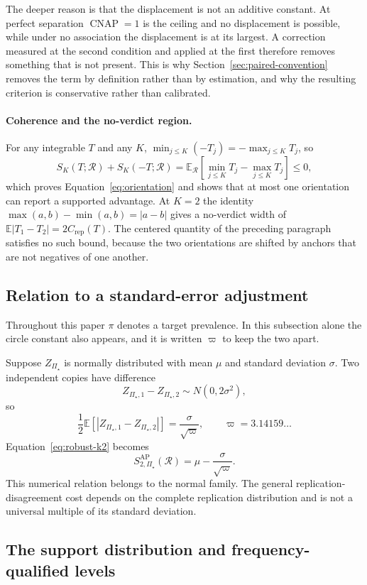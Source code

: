 \documentclass[11pt]{article}
\newcommand{\CNAP}{\operatorname{CNAP}}
\newcommand{\Regime}{\mathcal{R}}
\newcommand{\PSet}{\Pi_\star}
\newcommand{\E}{\mathbb{E}}
\theoremstyle{remark}
\begin{document}
The deeper reason is that the displacement is not an additive constant. At perfect separation $\CNAP=1$ is the ceiling and no displacement is possible, while under no association the displacement is at its largest. A correction measured at the second condition and applied at the first therefore removes something that is not present. This is why Section~\ref{sec:paired-convention} removes the term by definition rather than by estimation, and why the resulting criterion is conservative rather than calibrated.

\paragraph{Coherence and the no-verdict region.}
For any integrable $T$ and any $K$, $\min_{j\leq K}(-T_j)=-\max_{j\leq K}T_j$, so
\[
S_K(T;\Regime)+S_K(-T;\Regime)
=
\E_{\Regime}
\left[
\min_{j\leq K}T_j-\max_{j\leq K}T_j
\right]
\leq0,
\]
which proves Equation~\eqref{eq:orientation} and shows that at most one orientation can report a supported advantage. At $K=2$ the identity $\max(a,b)-\min(a,b)=|a-b|$ gives a no-verdict width of $\E|T_1-T_2|=2C_{\mathrm{rep}}(T)$. The centered quantity of the preceding paragraph satisfies no such bound, because the two orientations are shifted by anchors that are not negatives of one another.

\subsection{Relation to a standard-error adjustment}

Throughout this paper $\pi$ denotes a target prevalence. In this subsection alone the circle constant also appears, and it is written $\varpi$ to keep the two apart.

Suppose $Z_{\PSet}$ is normally distributed with mean $\mu$ and standard deviation $\sigma$. Two independent copies have difference
\[
Z_{\PSet,1}-Z_{\PSet,2}
\sim
N(0,2\sigma^2),
\]
so
\[
\frac12
\E
\left[
|Z_{\PSet,1}-Z_{\PSet,2}|
\right]
=
\frac{\sigma}{\sqrt{\varpi}},
\qquad
\varpi=3.14159\ldots
\]
Equation~\eqref{eq:robust-k2} becomes
\[
S_{2,\PSet}^{\mathrm{AP}}(\Regime)
=
\mu-\frac{\sigma}{\sqrt{\varpi}}.
\]
This numerical relation belongs to the normal family. The general replication-disagreement cost depends on the complete replication distribution and is not a universal multiple of its standard deviation.

\subsection{The support distribution and frequency-qualified levels}
\end{document}
